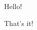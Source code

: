 \documentclass[aspectratio=169]{beamer}
\begin{document}
\begin{center} \maketitle \end{center}

\begin{frame}{Hello!}

That's it!

\end{frame}
\end{document}
